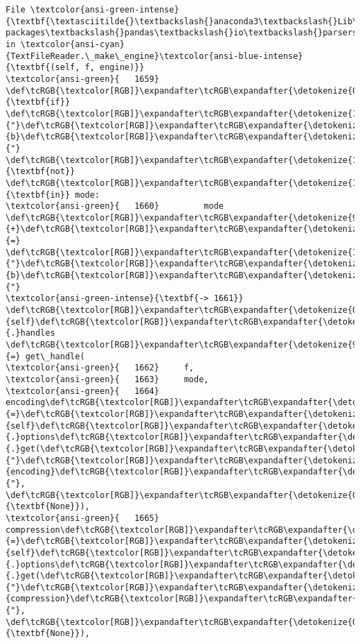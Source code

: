 \documentclass[11pt]{article}
\begin{document}
\begin{Verbatim}[commandchars=\\\{\}, frame=single, framerule=2mm, rulecolor=\color{outerrorbackground}]
File \textcolor{ansi-green-intense}{\textbf{\textasciitilde{}\textbackslash{}anaconda3\textbackslash{}Lib\textbackslash{}site-packages\textbackslash{}pandas\textbackslash{}io\textbackslash{}parsers\textbackslash{}readers.py:1661}}, in \textcolor{ansi-cyan}{TextFileReader.\_make\_engine}\textcolor{ansi-blue-intense}{\textbf{(self, f, engine)}}
\textcolor{ansi-green}{   1659}     \def\tcRGB{\textcolor[RGB]}\expandafter\tcRGB\expandafter{\detokenize{0,135,0}}{\textbf{if}} \def\tcRGB{\textcolor[RGB]}\expandafter\tcRGB\expandafter{\detokenize{175,0,0}}{"}\def\tcRGB{\textcolor[RGB]}\expandafter\tcRGB\expandafter{\detokenize{175,0,0}}{b}\def\tcRGB{\textcolor[RGB]}\expandafter\tcRGB\expandafter{\detokenize{175,0,0}}{"} \def\tcRGB{\textcolor[RGB]}\expandafter\tcRGB\expandafter{\detokenize{175,0,255}}{\textbf{not}} \def\tcRGB{\textcolor[RGB]}\expandafter\tcRGB\expandafter{\detokenize{175,0,255}}{\textbf{in}} mode:
\textcolor{ansi-green}{   1660}         mode \def\tcRGB{\textcolor[RGB]}\expandafter\tcRGB\expandafter{\detokenize{98,98,98}}{+}\def\tcRGB{\textcolor[RGB]}\expandafter\tcRGB\expandafter{\detokenize{98,98,98}}{=} \def\tcRGB{\textcolor[RGB]}\expandafter\tcRGB\expandafter{\detokenize{175,0,0}}{"}\def\tcRGB{\textcolor[RGB]}\expandafter\tcRGB\expandafter{\detokenize{175,0,0}}{b}\def\tcRGB{\textcolor[RGB]}\expandafter\tcRGB\expandafter{\detokenize{175,0,0}}{"}
\textcolor{ansi-green-intense}{\textbf{-> 1661}} \def\tcRGB{\textcolor[RGB]}\expandafter\tcRGB\expandafter{\detokenize{0,135,0}}{self}\def\tcRGB{\textcolor[RGB]}\expandafter\tcRGB\expandafter{\detokenize{98,98,98}}{.}handles \def\tcRGB{\textcolor[RGB]}\expandafter\tcRGB\expandafter{\detokenize{98,98,98}}{=} get\_handle(
\textcolor{ansi-green}{   1662}     f,
\textcolor{ansi-green}{   1663}     mode,
\textcolor{ansi-green}{   1664}     encoding\def\tcRGB{\textcolor[RGB]}\expandafter\tcRGB\expandafter{\detokenize{98,98,98}}{=}\def\tcRGB{\textcolor[RGB]}\expandafter\tcRGB\expandafter{\detokenize{0,135,0}}{self}\def\tcRGB{\textcolor[RGB]}\expandafter\tcRGB\expandafter{\detokenize{98,98,98}}{.}options\def\tcRGB{\textcolor[RGB]}\expandafter\tcRGB\expandafter{\detokenize{98,98,98}}{.}get(\def\tcRGB{\textcolor[RGB]}\expandafter\tcRGB\expandafter{\detokenize{175,0,0}}{"}\def\tcRGB{\textcolor[RGB]}\expandafter\tcRGB\expandafter{\detokenize{175,0,0}}{encoding}\def\tcRGB{\textcolor[RGB]}\expandafter\tcRGB\expandafter{\detokenize{175,0,0}}{"}, \def\tcRGB{\textcolor[RGB]}\expandafter\tcRGB\expandafter{\detokenize{0,135,0}}{\textbf{None}}),
\textcolor{ansi-green}{   1665}     compression\def\tcRGB{\textcolor[RGB]}\expandafter\tcRGB\expandafter{\detokenize{98,98,98}}{=}\def\tcRGB{\textcolor[RGB]}\expandafter\tcRGB\expandafter{\detokenize{0,135,0}}{self}\def\tcRGB{\textcolor[RGB]}\expandafter\tcRGB\expandafter{\detokenize{98,98,98}}{.}options\def\tcRGB{\textcolor[RGB]}\expandafter\tcRGB\expandafter{\detokenize{98,98,98}}{.}get(\def\tcRGB{\textcolor[RGB]}\expandafter\tcRGB\expandafter{\detokenize{175,0,0}}{"}\def\tcRGB{\textcolor[RGB]}\expandafter\tcRGB\expandafter{\detokenize{175,0,0}}{compression}\def\tcRGB{\textcolor[RGB]}\expandafter\tcRGB\expandafter{\detokenize{175,0,0}}{"}, \def\tcRGB{\textcolor[RGB]}\expandafter\tcRGB\expandafter{\detokenize{0,135,0}}{\textbf{None}}),

\end{Verbatim}
\end{document}
